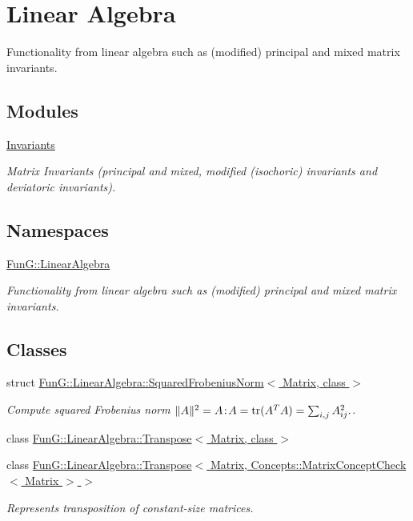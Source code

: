 \hypertarget{group__LinearAlgebraGroup}{}\section{Linear Algebra}
\label{group__LinearAlgebraGroup}


Functionality from linear algebra such as (modified) principal and mixed matrix invariants.  


\subsection*{Modules}
\begin{DoxyCompactItemize}
\item 
\hyperlink{group__InvariantGroup}{Invariants}
\begin{DoxyCompactList}\small\item\em Matrix Invariants (principal and mixed, modified (isochoric) invariants and deviatoric invariants). \end{DoxyCompactList}\end{DoxyCompactItemize}
\subsection*{Namespaces}
\begin{DoxyCompactItemize}
\item 
 \hyperlink{namespaceFunG_1_1LinearAlgebra}{Fun\+G\+::\+Linear\+Algebra}
\begin{DoxyCompactList}\small\item\em Functionality from linear algebra such as (modified) principal and mixed matrix invariants. \end{DoxyCompactList}\end{DoxyCompactItemize}
\subsection*{Classes}
\begin{DoxyCompactItemize}
\item 
struct \hyperlink{structFunG_1_1LinearAlgebra_1_1SquaredFrobeniusNorm}{Fun\+G\+::\+Linear\+Algebra\+::\+Squared\+Frobenius\+Norm$<$ Matrix, class $>$}
\begin{DoxyCompactList}\small\item\em Compute squared Frobenius norm $ \|A\|^2 = A\negthinspace : \negthinspace A = \mathrm{tr}(A^TA) = \sum_{i,j} A_{ij}^2. $. \end{DoxyCompactList}\item 
class \hyperlink{classFunG_1_1LinearAlgebra_1_1Transpose}{Fun\+G\+::\+Linear\+Algebra\+::\+Transpose$<$ Matrix, class $>$}
\item 
class \hyperlink{classFunG_1_1LinearAlgebra_1_1Transpose_3_01Matrix_00_01Concepts_1_1MatrixConceptCheck_3_01Matrix_01_4_01_4}{Fun\+G\+::\+Linear\+Algebra\+::\+Transpose$<$ Matrix, Concepts\+::\+Matrix\+Concept\+Check$<$ Matrix $>$ $>$}
\begin{DoxyCompactList}\small\item\em Represents transposition of constant-\/size matrices. \end{DoxyCompactList}\end{DoxyCompactItemize}
